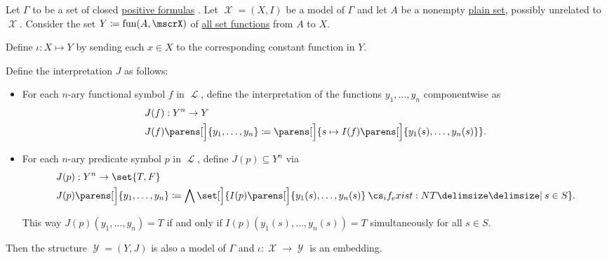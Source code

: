 \begin{proposition}\label{thm:functions_over_model_form_model}
  Let \( \Gamma \) to be a set of closed \hyperref[def:positive_formula]{positive formulas} . Let \( \mscrX = (X, I) \) be a model of \( \Gamma \) and let \( A \) be a nonempty \hyperref[def:set]{plain set}, possibly unrelated to \( \mscrX \). Consider the set \( Y \coloneqq \fun(A, \mscrX) \) of \hyperref[def:function]{all set functions} from \( A \) to \( X \).

  Define \( \iota: X \mapsto Y \) by sending each \( x \in X \) to the corresponding constant function in \( Y \).

  Define the interpretation \( J \) as follows:
  \begin{itemize}
    \item For each \( n \)-ary functional symbol \( f \) in \( \mscrL \), define the interpretation of the functions \( y_1, \ldots, y_n \) componentwise as
    \begin{equation*}
      \begin{aligned}
        &J(f): Y^n \to Y \\
        &J(f) \parens[\Big]{ y_1, \ldots, y_n } \coloneqq \parens[\Big]{ s \mapsto I(f) \parens[\Big]{ y_1(s), \ldots, y_n(s) } }.
      \end{aligned}
    \end{equation*}

    \item For each \( n \)-ary predicate symbol \( p \) in \( \mscrL \), define \( J(p) \subseteq Y^n \) via
    \begin{equation*}
      \begin{aligned}
        &J(p): Y^n \to \set{ T, F } \\
        &J(p) \parens[\Big]{ y_1, \ldots, y_n } \coloneqq \bigwedge \set[\Big]{ I(p) \parens[\Big]{ y_1(s), \ldots, y_n(s) } \given* s \in S }.
      \end{aligned}
    \end{equation*}

    This way \( J(p) (y_1, \ldots, y_n) = T \) if and only if \( I(p) (y_1(s), \ldots, y_n(s)) = T \) simultaneously for all \( s \in S \).
  \end{itemize}

  Then the structure \( \mscrY = (Y, J) \) is also a model of \( \Gamma \) and \( \iota: \mscrX \to \mscrY \) is an embedding.
\end{proposition}
